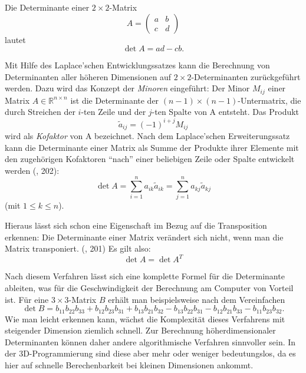 Die Determinante einer $2 \times 2$-Matrix
\begin{equation*}
 A = \begin{pmatrix}
      a & b \\
      c & d
     \end{pmatrix}
\end{equation*}
lautet
\begin{equation}
 \det A = ad - cb.
\end{equation}

Mit Hilfe des Laplace'schen Entwicklungssatzes kann die Berechnung von Determinanten aller höheren Dimensionen auf $2 \times 2$-Determinanten zurückgeführt werden. Dazu wird das Konzept der \emph{Minoren} eingeführt: Der Minor $M_{ij}$ einer Matrix $A \in \mathbb{R}^{n \times n}$ ist die Determinante der $(n-1) \times (n-1)$-Untermatrix, die durch Streichen der $i$-ten Zeile und der $j$-ten Spalte von A entsteht. Das Produkt
\begin{equation}
\label{cofactor}
 \tilde{a}_{ij} = (-1)^{i+j} M_{ij}
\end{equation}
wird als \emph{Kofaktor} von A bezeichnet. Nach dem Laplace'schen Erweiterungssatz kann die Determinante einer Matrix als Summe der Produkte ihrer Elemente mit den zugehörigen Kofaktoren \enquote{nach} einer beliebigen Zeile oder Spalte entwickelt werden (\vgl \citep{bronstein}, 202):
\begin{equation}
 \det A = \sum_{i=1}^n a_{ik} \tilde{a}_{ik} = \sum_{j=1}^n a_{kj} \tilde{a}_{kj}
\end{equation}
(mit $1 \leq k \leq n$).

Hieraus lässt sich schon eine Eigenschaft im Bezug auf die Transposition erkennen: Die Determinante einer Matrix verändert sich nicht, wenn man die Matrix transponiert. (\vgl \citep{bronstein}, 201) Es gilt also:
\begin{equation}
\label{transposeddeterminant}
 \det A = \det A^T
\end{equation}

Nach diesem Verfahren lässt sich eine komplette Formel für die Determinante ableiten, was für die Geschwindigkeit der Berechnung am Computer von Vorteil ist. Für eine $3 \times 3$-Matrix $B$ erhält man beispielsweise nach dem Vereinfachen
\begin{equation}
 \det B = b_{11} b_{22} b_{33} + b_{12} b_{23} b_{31} + b_{13} b_{21} b_{32} - b_{13} b_{22} b_{31} - b_{12} b_{21} b_{33} - b_{11} b_{23} b_{32}.
\end{equation}
Wie man leicht erkennen kann, wächst die Komplexität dieses Verfahrens mit steigender Dimension ziemlich schnell. Zur Berechnung höherdimensionaler Determinanten können daher andere algorithmische Verfahren sinnvoller sein. In der 3D-Programmierung sind diese aber mehr oder weniger bedeutungslos, da es hier auf schnelle Berechenbarkeit bei kleinen Dimensionen ankommt.

